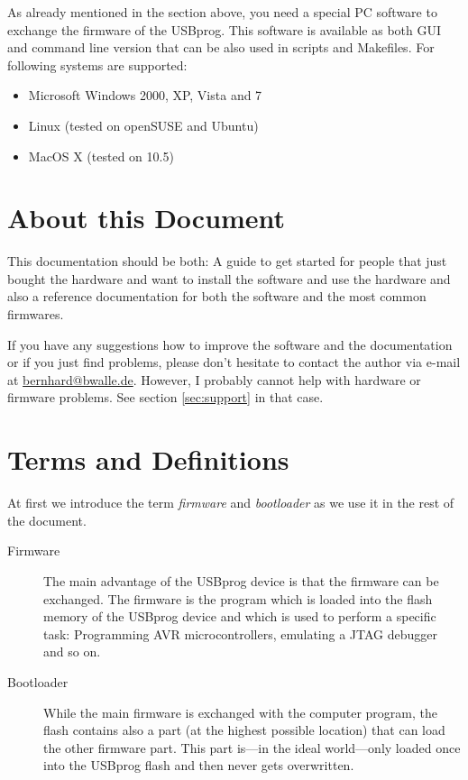 \documentclass[bibtotoc,UKenglish,halfparskip,oneside,DIV12]{scrreprt}
\begin{document}
As already mentioned in the section above, you need a special PC software to exchange the firmware
of the USBprog. This software is available as both GUI and command line version that can be also
used in scripts and Makefiles. For following systems are supported:

\begin{itemize}
  \item Microsoft Windows 2000, XP, Vista and 7
  \item Linux (tested on openSUSE and Ubuntu)
  \item MacOS X (tested on 10.5)
\end{itemize}

\section{About this Document}

This documentation should be both: A guide to get started for people that just bought the hardware
and want to install the software and use the hardware and also a reference documentation for both
the software and the most common firmwares.

If you have any suggestions how to improve the software and the documentation or if you just find
problems, please don't hesitate to contact the author via e-mail at \url{bernhard@bwalle.de}.
However, I probably cannot help with hardware or firmware problems. See section \vref{sec:support}
in that case.

\section{Terms and Definitions}

At first we introduce the term \emph{firmware} and \emph{bootloader} as we use it in the rest of the
document.

\begin{description}
  \item[Firmware] The main advantage of the USBprog device is that the firmware can be exchanged.
    The firmware is the program which is loaded into the flash memory of the USBprog device and
    which is used to perform a specific task: Programming AVR microcontrollers, emulating a JTAG
    debugger and so on.

  \item[Bootloader] While the main firmware is exchanged with the computer program, the flash
    contains also a part (at the highest possible location) that can load the other firmware part.
    This part is---in the ideal world---only loaded once into the USBprog flash and then never gets
    overwritten.
\end{description}
\end{document}
